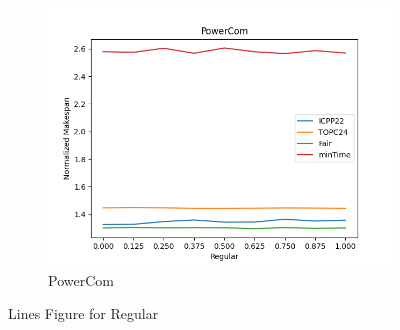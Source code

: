 \documentclass{article}
\begin{document}
\begin{figure}[htbp]
\begin{subfigure}[b]{0.32\textwidth}\includegraphics[width=\textwidth]{Results/Regular/Regular_PowerCom}\caption{PowerCom}\label{fig:lines_figures_Regular_PowerCom}\end{subfigure}
\hfill
\caption{Lines Figure for Regular}
\label{fig:lines_figures_Regular}
\end{figure}
\end{document}

